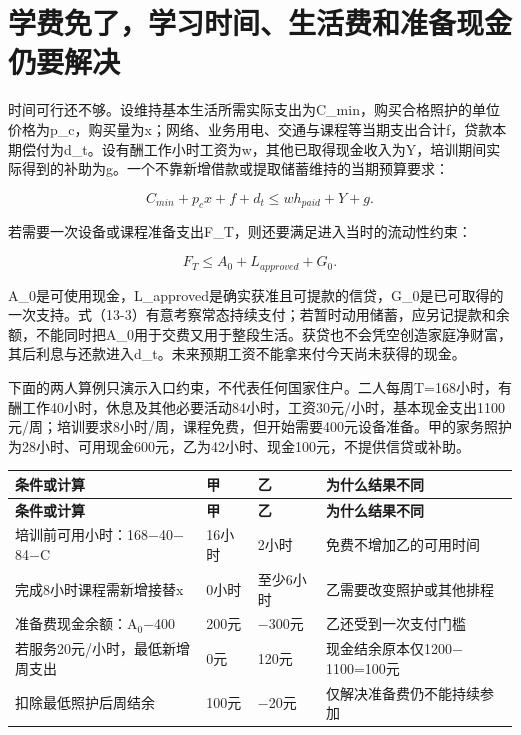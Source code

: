 \documentclass[UTF8,fontset=windows,12pt,a4paper,oneside,openany]{ctexbook}
\begin{document}
\section{学费免了，学习时间、生活费和准备现金仍要解决}

时间可行还不够。设维持基本生活所需实际支出为C\_min，购买合格照护的单位价格为p\_c，购买量为x；网络、业务用电、交通与课程等当期支出合计f，贷款本期偿付为d\_t。设有酬工作小时工资为w，其他已取得现金收入为Y，培训期间实际得到的补助为g。一个不靠新增借款或提取储蓄维持的当期预算要求：

\[
C_{min}+p_cx+f+d_t\leq wh_{paid}+Y+g.\tag{13-3}
\]

若需要一次设备或课程准备支出F\_T，则还要满足进入当时的流动性约束：

\[
F_T\leq A_0+L_{approved}+G_0.\tag{13-4}
\]

A\_0是可使用现金，L\_approved是确实获准且可提款的信贷，G\_0是已可取得的一次支持。式（13-3）有意考察常态持续支付；若暂时动用储蓄，应另记提款和余额，不能同时把A\_0用于交费又用于整段生活。获贷也不会凭空创造家庭净财富，其后利息与还款进入d\_t。未来预期工资不能拿来付今天尚未获得的现金。

下面的两人算例只演示入口约束，不代表任何国家住户。二人每周T=168小时，有酬工作40小时，休息及其他必要活动84小时，工资30元/小时，基本现金支出1100元/周；培训要求8小时/周，课程免费，但开始需要400元设备准备。甲的家务照护为28小时、可用现金600元，乙为42小时、现金100元，不提供信贷或补助。

\begingroup\footnotesize\setlength{\tabcolsep}{4pt}\renewcommand{\arraystretch}{1.25}
\begin{longtable}{>{\raggedright\arraybackslash}p{}>{\raggedright\arraybackslash}p{}>{\raggedright\arraybackslash}p{}>{\raggedright\arraybackslash}p{}}
\toprule
\textbf{条件或计算} & \textbf{甲} & \textbf{乙} & \textbf{为什么结果不同} \\
\midrule\endfirsthead
\toprule
\textbf{条件或计算} & \textbf{甲} & \textbf{乙} & \textbf{为什么结果不同} \\
\midrule\endhead
\bottomrule\endfoot
培训前可用小时：168\ensuremath{-}40\ensuremath{-}84\ensuremath{-}C & 16小时 & 2小时 & 免费不增加乙的可用时间 \\
完成8小时课程需新增接替x & 0小时 & 至少6小时 & 乙需要改变照护或其他排程 \\
准备费现金余额：A\ensuremath{_0}\ensuremath{-}400 & 200元 & \ensuremath{-}300元 & 乙还受到一次支付门槛 \\
若服务20元/小时，最低新增周支出 & 0元 & 120元 & 现金结余原本仅1200\ensuremath{-}1100=100元 \\
扣除最低照护后周结余 & 100元 & \ensuremath{-}20元 & 仅解决准备费仍不能持续参加 \\
\end{longtable}\endgroup
\end{document}
